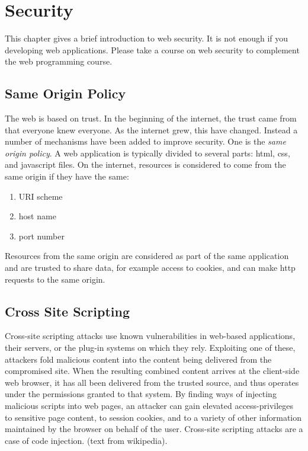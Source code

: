 
\chapter{Security} \label{chapter:security}
This chapter gives a brief introduction to web security. It is not enough if you developing web applications. Please take a course on web security to complement the web programming course.

\section{Same Origin Policy} \label{section:same:origin:policy}
The web is based on trust. In the beginning of the internet, the trust came from that everyone knew everyone. As the internet grew, this have changed. Instead a number of mechanisms have been added to improve security. One is the \emph{same origin policy}. A web application is typically divided to several parts: html, css, and javascript files. On the internet, resources is considered to come from the same origin if they have the same:
\begin{enumerate}
\item URI scheme
\item host name
\item port number
\end{enumerate}
Resources from the same origin are considered as part of the same application and are trusted to share data, for example access to cookies,   and can make http requests to the same origin.

\section{Cross Site Scripting} \label{chapter:xss}
Cross-site scripting attacks use known vulnerabilities in web-based applications, their servers, or the plug-in systems on which they rely. Exploiting one of these, attackers fold malicious content into the content being delivered from the compromised site. When the resulting combined content arrives at the client-side web browser, it has all been delivered from the trusted source, and thus operates under the permissions granted to that system. By finding ways of injecting malicious scripts into web pages, an attacker can gain elevated access-privileges to sensitive page content, to session cookies, and to a variety of other information maintained by the browser on behalf of the user. Cross-site scripting attacks are a case of code injection. (text from wikipedia).

